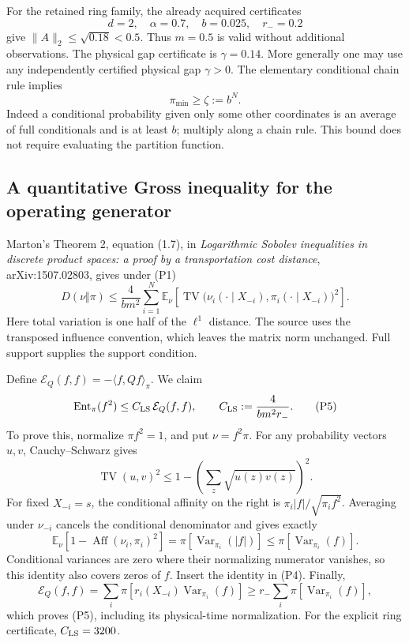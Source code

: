 For the retained ring family, the already acquired certificates
\[
 d=2,\quad\alpha=0.7,\quad b=0.025,\quad r_-=0.2
\]
give \(\|A\|_2\le\sqrt{0.18}<0.5\). Thus \(m=0.5\) is valid without
additional observations. The physical gap certificate is
\(\gamma=0.14\). More generally one may use any independently certified
physical gap \(\gamma>0\). The elementary conditional chain rule implies
\[
 \pi_{\min}\ge \zeta:=b^N.                       \tag{P3}
\]
Indeed a conditional probability given only some other coordinates is an
average of full conditionals and is at least \(b\); multiply along a chain
rule. This bound does not require evaluating the partition function.

\subsection{A quantitative Gross inequality for the operating generator}

Marton's Theorem 2, equation (1.7), in
\emph{Logarithmic Sobolev inequalities in discrete product spaces: a proof by
a transportation cost distance}, arXiv:1507.02803, gives under (P1)
\[
 D(\nu\Vert\pi)
 \le \frac{4}{b m^2}\sum_{i=1}^N
 \mathbb E_\nu
 \left[
 \operatorname{TV}\bigl(\nu_i(\cdot\mid X_{-i}),
                         \pi_i(\cdot\mid X_{-i})\bigr)^2
 \right].                                      \tag{P4}
\]
Here total variation is one half of the \(\ell^1\) distance. The source
uses the transposed influence convention, which leaves the matrix norm
unchanged. Full support supplies the support condition.

Define \(\mathcal E_Q(f,f)=-\langle f,Qf\rangle_\pi\). We claim
\[
 \operatorname{Ent}_\pi(f^2)
 \le C_{\rm LS}\,\mathcal E_Q(f,f),
 \qquad C_{\rm LS}:=\frac{4}{b m^2r_-}.           \tag{P5}
\]
To prove this, normalize \(\pi f^2=1\), and put \(\nu=f^2\pi\).
For any probability vectors \(u,v\), Cauchy--Schwarz gives
\[
 \operatorname{TV}(u,v)^2
 \le 1-\left(\sum_z\sqrt{u(z)v(z)}\right)^2.
\]
For fixed \(X_{-i}=s\), the conditional affinity on the right is
\(\pi_i|f|/\sqrt{\pi_i f^2}\). Averaging under \(\nu_{-i}\) cancels
the conditional denominator and gives exactly
\[
 \mathbb E_\nu[1-\operatorname{Aff}(\nu_i,\pi_i)^2]
 =\pi[\operatorname{Var}_{\pi_i}(|f|)]
 \le \pi[\operatorname{Var}_{\pi_i}(f)].
\]
Conditional variances are zero where their normalizing numerator vanishes,
so this identity also covers zeros of \(f\). Insert the identity in (P4).
Finally,
\[
 \mathcal E_Q(f,f)
 =\sum_i\pi[r_i(X_{-i})\operatorname{Var}_{\pi_i}(f)]
 \ge r_-\sum_i\pi[\operatorname{Var}_{\pi_i}(f)],
\]
which proves (P5), including its physical-time normalization.
For the explicit ring certificate, \(C_{\rm LS}=3200\).

